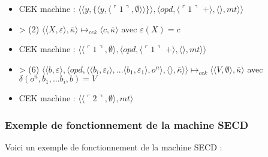 \documentclass[10pt,a4paper]{report}
\begin{document}
\begin{itemize}
\item[] CEK machine : $\langle\langle y,\{\langle y,\langle\ulcorner 1\urcorner,\emptyset\rangle\rangle\}\rangle,\langle opd,\langle\ulcorner 1\urcorner$ $+\rangle,\langle\rangle,mt\rangle\rangle$
\item[] > (2) $\langle\langle X,\varepsilon\rangle,\overline{\kappa}\rangle \longmapsto_{cek} \langle c,\overline{\kappa}\rangle$ avec $\varepsilon(X) = c$
\item[] CEK machine : $\langle\langle\ulcorner 1\urcorner,\emptyset\rangle,\langle opd,\langle\ulcorner 1\urcorner$ $+\rangle,\langle\rangle,mt\rangle\rangle$
\item[] > (6) $\langle  \langle b,\varepsilon\rangle,\langle opd,\langle \langle b_{i},\varepsilon_{i}\rangle,...\langle b_{1},\varepsilon_{1}\rangle ,o^{n}\rangle,\langle\rangle,\overline{\kappa}\rangle\rangle \longmapsto_{cek} \langle \langle V,\emptyset\rangle,\overline{\kappa}\rangle$ avec $\delta(o^{n},b_{1},...b_{i},b) = V$
\item[] CEK machine : $\langle\langle\ulcorner 2\urcorner,\emptyset\rangle,mt\rangle$
\end{itemize}
\newpage



\subsubsection{Exemple de fonctionnement de la machine SECD}\label{SECD}

Voici un exemple de fonctionnement de la machine SECD :	
\end{document}
